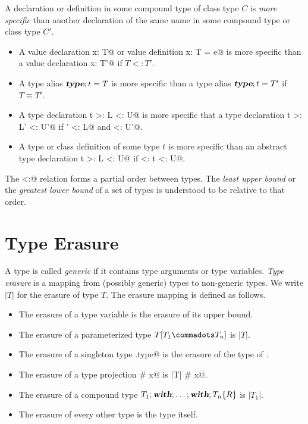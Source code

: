 \documentclass[11pt]{report}
\begin{document}
A declaration or definition in some compound type of class type $C$
is {\em more specific} than another
declaration of the same name in some compound type or class type $C'$.
\begin{itemize}
\item
A value declaration \verb@val x: T@ or value definition
\verb@val x: T = e@ is more specific than a value declaration
\verb@val x: T'@ if $T <: T'$.
\item
A type alias
$\mbox{\sl\bfseries type};t=T$ is more specific than a type alias $\mbox{\sl\bfseries type};t=T'$ if
$T \equiv T'$.
\item 
A type declaration \verb@type t >: L <: U@ is more specific that 
a type declaration \verb@type t >: L' <: U'@ if \verb@L' <: L@ and \verb@U <: U'@.
\item
A type or class definition of some type $t$ is more specific than an abstract
type declaration \verb@type t >: L <: U@ if
\verb@L <: t <: U@.
\end{itemize}

The \verb@<:@ relation forms a partial order between types. The {\em
least upper bound} or the {\em greatest lower bound} of a set of types
is understood to be relative to that order.

\section{Type Erasure}
\label{sec:erasure}

A type is called {\em generic} if it contains type arguments or type variables.
{\em Type erasure} is a mapping from (possibly generic) types to
non-generic types. We write $|T|$ for the erasure of type $T$.
The erasure mapping is defined as follows.
\begin{itemize}
\item The erasure of a type variable is the erasure of its upper bound.
\item The erasure of a parameterized type $T[T_1 \commadots T_n]$ is $|T|$.
\item The erasure of a singleton type \verb@p.type@ is the 
      erasure of the type of \verb@p@.
\item The erasure of a type projection \verb@T # x@ is \verb@|T| # x@.
\item The erasure of a compound type $T_1;\mbox{\sl\bfseries with};\ldots;\mbox{\sl\bfseries with};T_n\{R\}$ is $|T_1|$.
\item The erasure of every other type is the type itself.
\end{itemize}
\end{document}

